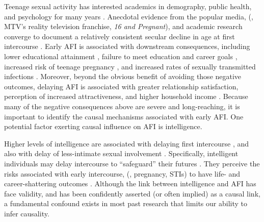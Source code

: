 Teenage sexual activity has interested academics in demography, public health, and psychology for many years \citep{Brooks-Gunn1989,kinsey1948sexual,santelli2000adolescent}. Anecdotal evidence from the popular media, (\eg, MTV's reality television franchise, \textit{16 and Pregnant}\nocite{mtv}), and academic research converge to document a relatively consistent secular decline in age at first intercourse  \citep[AFI; see][]{bozon2003,finer2007trends,Kann2014}. Early AFI is associated with downstream consequences, including lower educational attainment \citep{Harden2012,Spriggs2008,Wellings2001}, failure to meet education and career goals \citep{halpern2000smart}, increased risk of teenage pregnancy \citep{Leitenberg2000,Wellings2001}, and increased rates of sexually transmitted infections \citep[STIs;][]{kaestle2005young}. Moreover, beyond the obvious benefit of avoiding those negative outcomes, delaying AFI is associated with greater relationship satisfaction, perception of increased attractiveness, and higher household income \citep{Harden2012}. Because many of the negative consequences above are severe and long-reaching, it is important to identify the causal mechanisms associated with early AFI. One potential factor exerting causal influence on AFI is intelligence.

Higher levels of intelligence are associated with delaying first intercourse \citep{halpern2000smart,mott1983early,Paul2000,Woodward2001}, and also with delay of less-intimate sexual involvement \citep{halpern2000smart}. Specifically, intelligent individuals may delay intercourse to ``safeguard'' their futures \citep{kirby2002effective, manlove1998influence, raffaelli2003sexual}. They perceive the risks associated with early intercourse, (\eg, pregnancy, STIs) to have life- and career-shattering outcomes \citep{halpern2000smart,harden2011don}. Although the link between intelligence and AFI has face validity, and has been confidently asserted (or often implied) as a causal link, a fundamental confound exists in most past research that limits our ability to infer causality.

